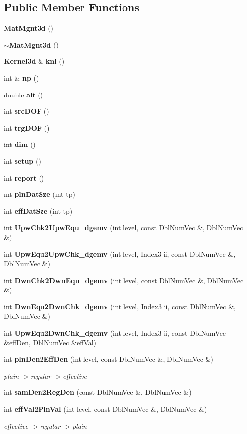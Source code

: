 \subsection*{Public Member Functions}
\begin{CompactItemize}
\item 
{\bf Mat\-Mgnt3d} ()
\item 
{\bf $\sim$Mat\-Mgnt3d} ()
\item 
{\bf Kernel3d} \& {\bf knl} ()
\item 
int \& {\bf np} ()
\item 
double {\bf alt} ()
\item 
int {\bf src\-DOF} ()
\item 
int {\bf trg\-DOF} ()
\item 
int {\bf dim} ()
\item 
int {\bf setup} ()
\item 
int {\bf report} ()
\item 
int {\bf pln\-Dat\-Sze} (int tp)
\item 
int {\bf eff\-Dat\-Sze} (int tp)
\item 
int {\bf Upw\-Chk2Upw\-Equ\_\-dgemv} (int level, const Dbl\-Num\-Vec \&, Dbl\-Num\-Vec \&)
\item 
int {\bf Upw\-Equ2Upw\-Chk\_\-dgemv} (int level, Index3 ii, const Dbl\-Num\-Vec \&, Dbl\-Num\-Vec \&)
\item 
int {\bf Dwn\-Chk2Dwn\-Equ\_\-dgemv} (int level, const Dbl\-Num\-Vec \&, Dbl\-Num\-Vec \&)
\item 
int {\bf Dwn\-Equ2Dwn\-Chk\_\-dgemv} (int level, Index3 ii, const Dbl\-Num\-Vec \&, Dbl\-Num\-Vec \&)
\item 
int {\bf Upw\-Equ2Dwn\-Chk\_\-dgemv} (int level, Index3 ii, const Dbl\-Num\-Vec \&eff\-Den, Dbl\-Num\-Vec \&eff\-Val)
\item 
int {\bf pln\-Den2Eff\-Den} (int level, const Dbl\-Num\-Vec \&, Dbl\-Num\-Vec \&)
\begin{CompactList}\small\item\em plain-$>$regular-$>$effective \item\end{CompactList}\item 
int {\bf sam\-Den2Reg\-Den} (const Dbl\-Num\-Vec \&, Dbl\-Num\-Vec \&)
\item 
int {\bf eff\-Val2Pln\-Val} (int level, const Dbl\-Num\-Vec \&, Dbl\-Num\-Vec \&)
\begin{CompactList}\small\item\em effective-$>$regular-$>$plain \item\end{CompactList}\item 

\end{CompactItemize}
